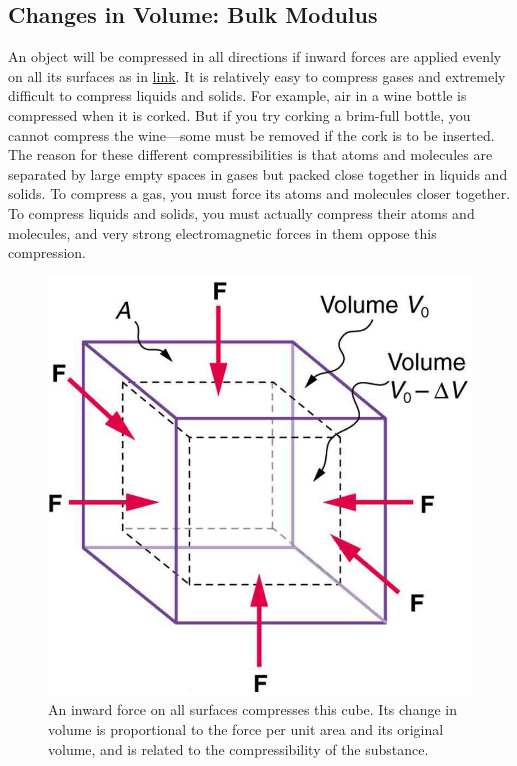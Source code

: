 \documentclass[
]{book}
\begin{document}
\hypertarget{fs-id1165298483858}{}
\hypertarget{changes-in-volume-bulk-modulus}{%
\subsection{Changes in Volume: Bulk Modulus}\label{changes-in-volume-bulk-modulus}}

An object will be compressed in all directions if inward forces are
applied evenly on all its surfaces as in
\protect\hyperlink{import-auto-id1165296230954}{link}. It is
relatively easy to compress gases and extremely difficult to compress
liquids and solids. For example, air in a wine bottle is compressed when
it is corked. But if you try corking a brim-full bottle, you cannot
compress the wine---some must be removed if the cork is to be inserted.
The reason for these different compressibilities is that atoms and
molecules are separated by large empty spaces in gases but packed close
together in liquids and solids. To compress a gas, you must force its
atoms and molecules closer together. To compress liquids and solids, you
must actually compress their atoms and molecules, and very strong
electromagnetic forces in them oppose this compression.

\begin{figure}
\hypertarget{import-auto-id1165296230954}{%
\centering
\includegraphics{images/Figure_06_03_09a.jpg}
\caption{An inward force on all surfaces compresses this cube. Its change in
volume is proportional to the force per unit area and its original
volume, and is related to the compressibility of the
substance.}\label{import-auto-id1165296230954}
}
\end{figure}
\end{document}
